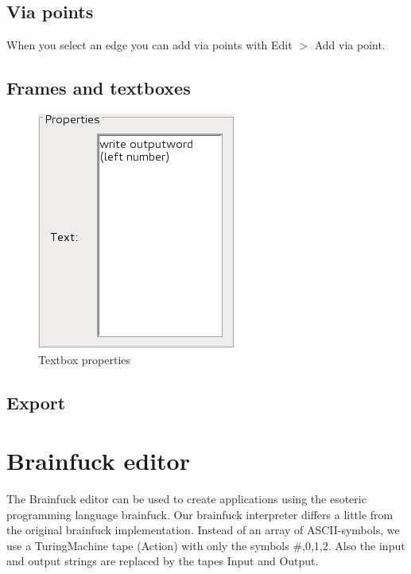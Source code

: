 \documentclass[%
  a4paper,%
  11pt,%
  blue,%
  hyperref	%
  ]{tubsartcl}
\begin{document}
\newpage

\subsection{Via points}
\label{sec:via-points}
When you select an edge you can add via points with Edit $>$ Add via point.

\subsection{Frames and textboxes}
\label{sec:frames-textboxes}

\begin{figure}[!htb]
\begin{center}
\includegraphics[scale=0.5]{graphics_gui/text_properties.png}
\end{center}
\caption{Textbox properties}
\label{pic:text_properties}
\end{figure}

\newpage

\subsection{Export}
\label{sec:export}

\newpage

\section{Brainfuck editor}
\label{sec:brainfuck-editor}
The Brainfuck editor  can be used to create applications using the esoteric programming language brainfuck. Our brainfuck interpreter differs a little from the original brainfuck implementation. Instead of an array of ASCII-symbols, we use a TuringMachine tape (Action) with only the symbols \#,0,1,2. Also the input and output strings are replaced by the tapes Input and Output.\\
\end{document}
